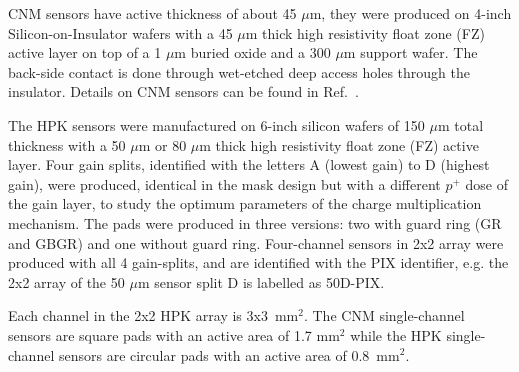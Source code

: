 \documentclass[preprint,1p]{elsarticle}
\begin{document}
CNM sensors have active thickness of about 45 $\mu$m, they were
produced on 4-inch Silicon-on-Insulator wafers with a 45 $\mu$m thick high
resistivity float zone (FZ) active layer on top of a 1 $\mu$m buried oxide and a
300 $\mu$m support wafer. The back-side contact is done through wet-etched deep
access holes through the insulator. Details on CNM sensors can be found in
Ref.~\cite{CNMSensors, Cartiglia201783}. 

The HPK sensors were manufactured on 6-inch silicon wafers of 150 $\mu$m total
thickness with a 50 $\mu$m or 80 $\mu$m thick high resistivity float zone (FZ)
active layer. Four gain splits, identified with the letters A (lowest gain) to D
(highest gain), were produced, identical in the mask design but with a different
$p^+$ dose of the gain layer, to study the optimum parameters of the charge
multiplication mechanism. The pads were produced in three versions: two with
guard ring (GR and GBGR) and one without guard ring. Four-channel sensors in 2x2
array were produced with all 4 gain-splits, and are identified with the PIX
identifier, e.g. the 2x2 array of the 50 $\mu$m sensor split D is labelled as
50D-PIX. 

Each channel in the 2x2 HPK array is 3x3~mm$^2$. The CNM single-channel sensors
are square pads with an active area of 1.7 mm$^2$ while the HPK single-channel
sensors are circular pads with an active area of 0.8~mm$^2$.
\end{document}
